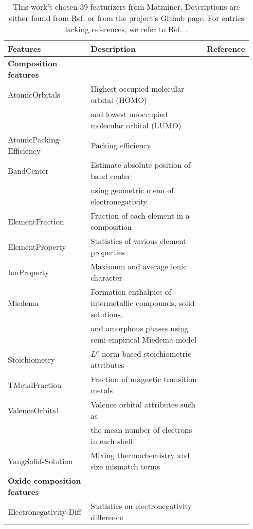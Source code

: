 \begin{center}
\begin{longtable}{M{3.5cm} M{6.5cm} M{2.0cm}}
\caption{This work's chosen 39 featurizers from Matminer. Descriptions are either found from Ref. \cite{Ward2018} or from the project's Github page. For entries lacking references, we refer to Ref.~\cite{Ward2018}.}
\label{table:featurizers} 
\\ \hline
Features & Description & Reference \\
\hline 
  \textbf{Composition features} & & \\ 
  AtomicOrbitals & Highest occupied molecular orbital (HOMO) & \cite{Kotochigova1997}  \\   
   & and lowest unoccupied molecular orbital (LUMO) &  \\   
  AtomicPacking-Efficiency & Packing efficiency & \cite{Laws2015}  \\   
  BandCenter & Estimate absolute position of band center  & \cite{Butler1978} \\   
   & using geometric mean of electronegativity &  \\  
  ElementFraction & Fraction of each element in a composition &    \\   
  ElementProperty & Statistics of various element properties & \cite{Ong2013,Ward2016, Deml2016}  \\   
  IonProperty & Maximum and average ionic character & \cite{Ward2016} \\   
  Miedema & Formation enthalpies of intermetallic compounds, solid solutions, & \cite{Weeber1987} \\   
   & and amorphous phases using semi-empirical Miedema model &  \\   
  Stoichiometry & $L^p$ norm-based stoichiometric attributes & \cite{Ward2016} \\   
  TMetalFraction & Fraction of magnetic transition metals & \cite{Deml2016}  \\   
  ValenceOrbital & Valence orbital attributes such as & \cite{Ward2016}  \\   
   &  the mean number of electrons in each shell &   \\   
  YangSolid-Solution & Mixing thermochemistry and size mismatch terms & \cite{Yang2012} \\
    \hline 
  \textbf{Oxide composition features} &  &  \\
  Electronegativity-Diff & Statistics on electronegativity difference & \cite{Deml2016} \\   

\end{longtable}
\end{center}
